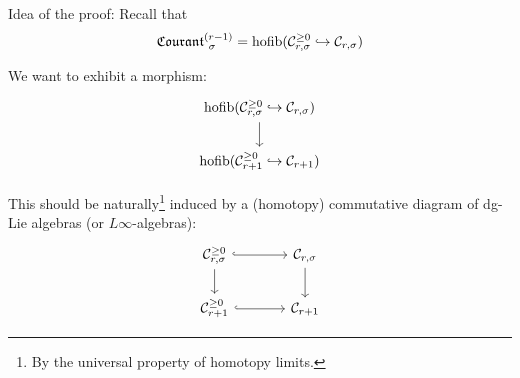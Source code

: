 \documentclass[beamer,10pt]{standalone}
\begin{document}
\begin{frame}{Idea of the proof:}
	Recall that $$\Courant[\sigma]{r-1} = \hofib(\mathcal{C}_{r,\sigma}^{\geq 0} \hookrightarrow \mathcal{C}_{r,\sigma}) $$
	\pause
	\vfill

	We want to exhibit a morphism:
		\begin{displaymath}
			\begin{tikzcd}[ampersand replacement=\&]
				\hofib(\mathcal{C}_{r,\sigma}^{\geq 0} \hookrightarrow \mathcal{C}_{r,\sigma}) \ar[d]
				\\
				\hofib(\mathcal{C}_{r+1}^{\geq 0} \hookrightarrow \mathcal{C}_{r+1})
			\end{tikzcd}
		\end{displaymath}
	\pause
	\vfill

	This should be naturally\footnote{By the universal property of homotopy limits.} induced by a (homotopy) commutative diagram of dg-Lie algebras (or $L\infty$-algebras):
		\begin{displaymath}
			\begin{tikzcd}[ampersand replacement=\&,column sep = large]
				\mathcal{C}_{r,\sigma}^{\geq 0} \ar[r,hook] \ar[d ]
				\& \mathcal{C}_{r,\sigma} \ar[d, ]
				\\
				\mathcal{C}_{r+1}^{\geq 0} \ar[r,hook] \& \mathcal{C}_{r+1} 
			\end{tikzcd}
		\end{displaymath}
	
\end{frame}
\note[itemize]
{
	\item 
	\item 
}
\end{document}
